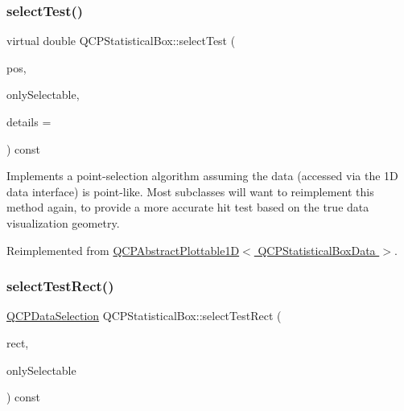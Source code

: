 \mbox{\label{class_q_c_p_statistical_box_ae78bfe096f463a8d08464c20cc25defe}} 
\subsubsection{\texorpdfstring{select\+Test()}{selectTest()}\hspace{0.1cm}{\footnotesize\ttfamily [2/2]}}
{\footnotesize\ttfamily virtual double Q\+C\+P\+Statistical\+Box\+::select\+Test (\begin{DoxyParamCaption}\item[{const Q\+PointF \&}]{pos,  }\item[{bool}]{only\+Selectable,  }\item[{Q\+Variant $\ast$}]{details = {} }\end{DoxyParamCaption}) const\hspace{0.3cm}{\ttfamily [virtual]}}

Implements a point-\/selection algorithm assuming the data (accessed via the 1D data interface) is point-\/like. Most subclasses will want to reimplement this method again, to provide a more accurate hit test based on the true data visualization geometry.

Reimplemented from \hyperlink{class_q_c_p_abstract_plottable1_d_a071e2df66ba1746067dfcb5e27947b43}{Q\+C\+P\+Abstract\+Plottable1\+D$<$ Q\+C\+P\+Statistical\+Box\+Data $>$}.

\mbox{\label{class_q_c_p_statistical_box_a42febad6ad5e924a151434cc434b4ffc}} 
\subsubsection{\texorpdfstring{select\+Test\+Rect()}{selectTestRect()}\hspace{0.1cm}{\footnotesize\ttfamily [1/2]}}
{\footnotesize\ttfamily \hyperlink{class_q_c_p_data_selection}{Q\+C\+P\+Data\+Selection} Q\+C\+P\+Statistical\+Box\+::select\+Test\+Rect (\begin{DoxyParamCaption}\item[{const Q\+RectF \&}]{rect,  }\item[{bool}]{only\+Selectable }\end{DoxyParamCaption}) const\hspace{0.3cm}{\ttfamily [virtual]}}





